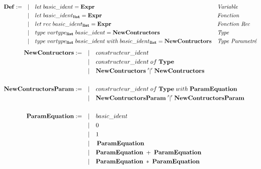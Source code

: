 \documentclass[
  12pt,
]{article}
\begin{document}
\begin{align*}
  \bf{Def} := \quad & |\quad let \; basic\_ident = \bf{Expr}                                                                        &  & \textit{Variable}       \\
                    & |\quad let \; basic\_ident_{\bf{list}} = \bf{Expr}                                                            &  & \textit{Fonction}       \\
                    & |\quad let \; rec \; basic\_ident_{\bf{list}} = \bf{Expr}                                                     &  & \textit{Fonction Rec}   \\
                    & |\quad type \; vartype_{\bf{list}} \; basic\_ident =  \bf{NewContructors}                                     &  & \textit{Type}           \\
                    & |\quad type \; vartype_{\bf{list}} \; basic\_ident \; with \; basic\_ident_{\bf{list}} =  \bf{NewContructors} &  & \textit{Type Parametré}
\end{align*} \begin{align*}
  \bf{NewContructors} :=   \quad       & |\quad  constructeur\_ident                                                            \\
                                       & |\quad  constructeur\_ident \;of\; \textbf{Type}                                       \\
                                       & |\quad  \textbf{NewContructors} \;'|'\; \textbf{NewContructors}                        \\
  \\
  \bf{NewContructorsParam} :=    \quad & |\quad constructeur\_ident \;of\; \textbf{Type} \; with \; \textbf{ParamEquation}      \\
                                       & |\quad  \textbf{NewContructorsParam} \;'|'\; \textbf{NewContructorsParam}         &  & \\
  \\
  \bf{ParamEquation} := \quad          & |\quad basic\_ident                                                                    \\
                                       & |\quad 0                                                                               \\
                                       & |\quad 1                                                                               \\
                                       & |\quad \,\textbf{ParamEquation}\,                                                    \\
                                       & |\quad \textbf{ParamEquation} \; + \; \textbf{ParamEquation}                           \\
                                       & |\quad \textbf{ParamEquation} \; * \; \textbf{ParamEquation}                           \\
\end{align*}
\end{document}
